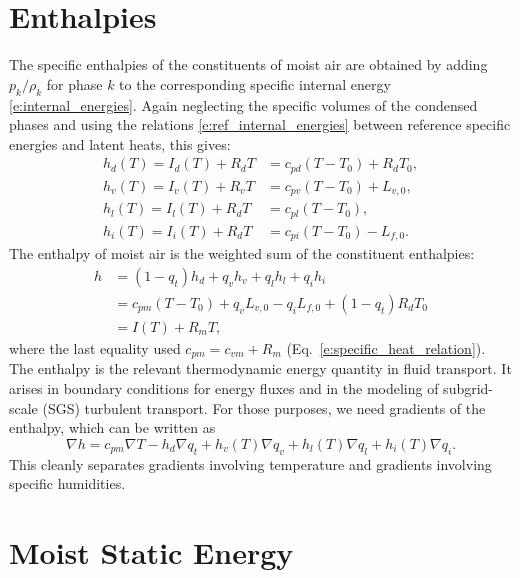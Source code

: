 \documentclass{report}
\begin{document}
\section{Enthalpies}\label{s:enthalpies}

The specific enthalpies of the constituents of moist air are obtained by adding $p_k/\rho_k$ for phase $k$ to the corresponding specific internal energy \eqref{e:internal_energies}. Again neglecting the specific volumes of the condensed phases and using the relations \eqref{e:ref_internal_energies} between reference specific energies and latent heats, this gives:
\begin{subequations}\label{e:enthalpies}
\begin{align}
    h_d(T) = I_d(T) + R_d T &= c_{pd}(T-T_0) + R_d T_0, \\
    h_v(T) = I_v(T) + R_v T &= c_{pv}(T-T_0) + L_{v,0}, \\
    h_l(T) = I_l(T) + R_d T &= c_{pl}(T-T_0), \\
    h_i(T) = I_i(T) + R_d T &= c_{pi}(T-T_0) - L_{f,0}.
\end{align}
\end{subequations}
The enthalpy of moist air is the weighted sum of the constituent enthalpies:
\begin{equation}
\begin{split}\label{e:enthalpy_definition}
    h   &= (1-q_t) h_d + q_v h_v + q_l h_l + q_i h_i \\
        &= c_{pm} (T-T_0) + q_v L_{v,0} - q_i L_{f,0} + (1-q_t) R_d T_0\\
        &= I(T) + R_m T,
\end{split}
\end{equation}
where the last equality used $c_{pm} = c_{vm} + R_m$ (Eq.~\ref{e:specific_heat_relation}). The enthalpy is the relevant thermodynamic energy quantity in fluid transport. It arises in boundary conditions for energy fluxes and in the modeling of subgrid-scale (SGS) turbulent transport. For those purposes, we need gradients of the enthalpy, which can be written as 
\begin{equation}\label{e:enthalpy_gradient}
    \nabla h = c_{pm} \nabla T - h_d \nabla q_t
    + h_v(T) \nabla q_v + h_l(T) \nabla q_l + h_i(T) \nabla q_i.
\end{equation}
This cleanly separates gradients involving temperature and gradients involving specific humidities.

\section{Moist Static Energy}
\end{document}
